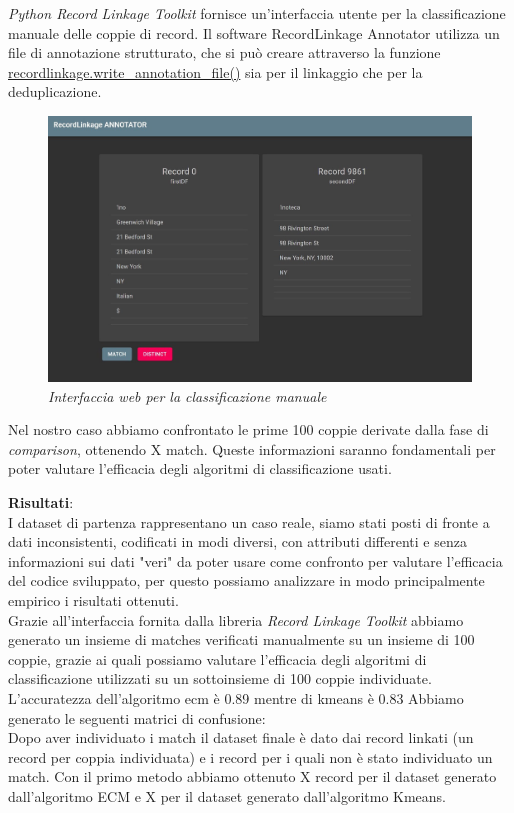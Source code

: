 \documentclass[a4paper,12pt]{article}
\begin{document}
\noindent \textit{Python Record Linkage Toolkit}  fornisce un'interfaccia utente per la classificazione manuale delle coppie di record. Il software RecordLinkage Annotator utilizza un file di annotazione strutturato, che si può creare attraverso la funzione \href{https://recordlinkage.readthedocs.io/en/latest/annotation.html}{recordlinkage.write\_annotation\_file()} sia per il linkaggio che per la deduplicazione.\\
\begin{figure}[H]
	\centering
	\includegraphics[width=0.8\linewidth]{img/matchCenter.png}
	\caption{\textit{Interfaccia web per la classificazione manuale}}
\end{figure}

\noindent Nel nostro caso abbiamo confrontato le prime 100 coppie derivate dalla fase di \textit{comparison}, ottenendo X match. Queste informazioni saranno fondamentali per poter valutare l'efficacia degli algoritmi di classificazione usati. 

\noindent \textbf{Risultati}: \\
\noindent I dataset di partenza rappresentano un caso reale, siamo stati posti di fronte a dati inconsistenti, codificati in modi diversi, con attributi differenti e senza informazioni sui dati "veri" da poter usare come confronto per valutare l'efficacia del codice sviluppato, per questo possiamo analizzare in modo principalmente empirico i risultati ottenuti. \\

\noindent Grazie all'interfaccia fornita dalla libreria \textit{Record Linkage Toolkit} abbiamo generato un insieme di matches verificati manualmente su un insieme di 100 coppie, grazie ai quali possiamo valutare l'efficacia degli algoritmi di classificazione utilizzati su un sottoinsieme di 100 coppie individuate. \\

\noindent L'accuratezza dell'algoritmo ecm è 0.89 mentre di kmeans è 0.83
Abbiamo generato le seguenti matrici di confusione: \\

\noindent Dopo aver individuato i match il dataset finale è dato dai record linkati (un record per coppia individuata) e i record per i quali non è stato individuato un match.
Con il primo metodo abbiamo ottenuto X record per il dataset generato dall'algoritmo ECM e X per il dataset generato dall'algoritmo Kmeans. 


\newpage
\printbibliography[title=Bibliografia]
\end{document}
